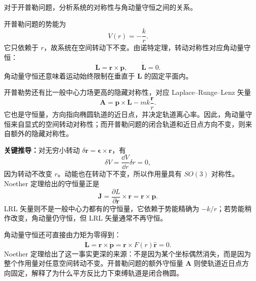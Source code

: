 \begin{question}[开普勒问题的对称性]
对于开普勒问题，分析系统的对称性与角动量守恒之间的关系。

\begin{solution}
开普勒问题的势能为
\[
  V(r)=-\frac{k}{r}.
\]
它只依赖于 $r$，故系统在空间转动下不变。由诺特定理，转动对称性对应角动量守恒：
\[
  \boldsymbol L=\boldsymbol r\times\boldsymbol p,
  \qquad
  \dot{\boldsymbol L}=0.
\]
角动量守恒还意味着运动始终限制在垂直于 $\boldsymbol L$ 的固定平面内。

开普勒势还有比一般中心力场更高的隐藏对称性，对应 Laplace--Runge--Lenz 矢量
\[
  \boldsymbol A=\boldsymbol p\times\boldsymbol L-mk\frac{\boldsymbol r}{r}.
\]
它也是守恒量，方向指向椭圆轨道的近日点，并决定轨道离心率。因此，角动量守恒来自显式的空间转动对称性；而开普勒问题的闭合轨道和近日点方向不变，则来自额外的隐藏对称性。


\medskip
\textbf{关键推导：}对无穷小转动 $\delta\boldsymbol r=\boldsymbol\epsilon\times\boldsymbol r$，有
\[
  \delta V=\frac{\dd V}{\dd r}\delta r=0,
\]
因为转动不改变 $r$。动能也在转动下不变，所以作用量具有 $SO(3)$ 对称性。Noether 定理给出的守恒量正是
\[
  \boldsymbol J=\frac{\partial L}{\partial\dot{\boldsymbol r}}\times\boldsymbol r
  =\boldsymbol r\times\boldsymbol p.
\]
LRL 矢量则不是一般中心力都有的守恒量，它依赖于势能精确为 $-k/r$；若势能稍作改变，角动量仍守恒，但 LRL 矢量通常不再守恒。


\medskip
角动量守恒还可直接由力矩为零得到：
\[
  \dot{\boldsymbol L}=\boldsymbol r\times\dot{\boldsymbol p}
  =\boldsymbol r\times F(r)\hat{\boldsymbol r}=0.
\]
Noether 定理给出了这一事实更深的来源：不是因为某个坐标偶然消失，而是因为整个作用量对任意空间转动不变。开普勒问题的额外守恒量 $\boldsymbol A$ 则使轨道近日点方向固定，解释了为什么平方反比力下束缚轨道是闭合椭圆。
\end{solution}
\end{question}

